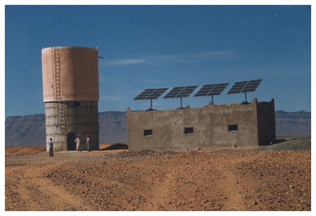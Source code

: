 \documentclass[xcolor={usenames,svgnames,dvipsnames}]{beamer}
\begin{document}
\begin{frame}[label={sec:orgd68b236}]{}
\begin{center}
\includegraphics[width=.9\linewidth]{../figs/Bombeo.jpg}
\end{center}
\end{frame}
\end{document}

